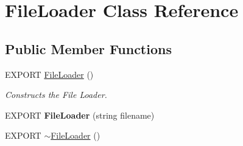 \hypertarget{class_file_loader}{\section{\-File\-Loader \-Class \-Reference}
\label{class_file_loader}
}
\subsection*{\-Public \-Member \-Functions}
\begin{DoxyCompactItemize}
\item 
\hypertarget{class_file_loader_a51313b536560d1d89d8350475d2bc749}{\-E\-X\-P\-O\-R\-T \hyperlink{class_file_loader_a51313b536560d1d89d8350475d2bc749}{\-File\-Loader} ()}\label{class_file_loader_a51313b536560d1d89d8350475d2bc749}

\begin{DoxyCompactList}\small\item\em \-Constructs the \-File \-Loader. \end{DoxyCompactList}\item 
\hypertarget{class_file_loader_a37da87f465229c5aaaa5d979a2789c22}{\-E\-X\-P\-O\-R\-T {\bfseries \-File\-Loader} (string filename)}\label{class_file_loader_a37da87f465229c5aaaa5d979a2789c22}

\item 
\hypertarget{class_file_loader_a0954776182dd01364bdb216539ce398b}{\-E\-X\-P\-O\-R\-T \hyperlink{class_file_loader_a0954776182dd01364bdb216539ce398b}{$\sim$\-File\-Loader} ()}\label{class_file_loader_a0954776182dd01364bdb216539ce398b}


\end{DoxyCompactItemize}
